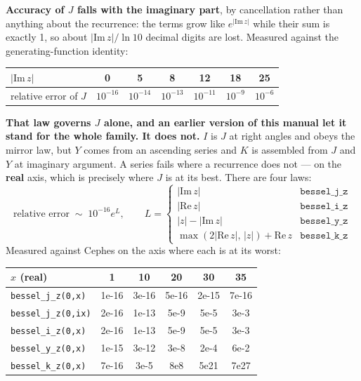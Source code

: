 \documentclass[11pt]{article}
\newcommand{\code}[1]{\texttt{#1}}
\begin{document}
\textbf{Accuracy of $J$ falls with the imaginary part}, by cancellation
rather than anything about the recurrence: the terms grow like
$e^{|\mathrm{Im}\,z|}$ while their sum is exactly 1, so about
$|\mathrm{Im}\,z|/\ln 10$ decimal digits are lost. Measured against the
generating-function identity:

\begin{center}
\begin{tabular}{lcccccc}
$|\mathrm{Im}\,z|$ & 0 & 5 & 8 & 12 & 18 & 25\\
\hline
relative error of $J$ & $10^{-16}$ & $10^{-14}$ & $10^{-13}$ &
$10^{-11}$ & $10^{-9}$ & $10^{-6}$\\
\end{tabular}
\end{center}

\textbf{That law governs $J$ alone, and an earlier version of this
manual let it stand for the whole family. It does not.} $I$ is $J$ at
right angles and obeys the mirror law, but $Y$ comes from an ascending
series and $K$ is assembled from $J$ and $Y$ at imaginary argument. A
series fails where a recurrence does not --- on the \textbf{real} axis,
which is precisely where $J$ is at its best. There are four laws:
\[
  \text{relative error} \;\sim\; 10^{-16}e^{L},\qquad
  L = \begin{cases}
    |\mathrm{Im}\,z| & \code{bessel\_j\_z}\\
    |\mathrm{Re}\,z| & \code{bessel\_i\_z}\\
    |z| - |\mathrm{Im}\,z| & \code{bessel\_y\_z}\\
    \max(2|\mathrm{Re}\,z|,\,|z|) + \mathrm{Re}\,z & \code{bessel\_k\_z}
  \end{cases}
\]
Measured against Cephes on the axis where each is at its worst:

\begin{center}
\begin{tabular}{lccccc}
$x$ (real) & 1 & 10 & 20 & 30 & 35\\
\hline
\code{bessel\_j\_z(0,x)}  & 1e-16 & 3e-16 & 5e-16 & 2e-15 & 7e-16\\
\code{bessel\_j\_z(0,ix)} & 2e-16 & 1e-13 & 5e-9  & 5e-5  & 3e-3\\
\code{bessel\_i\_z(0,x)}  & 2e-16 & 1e-13 & 5e-9  & 5e-5  & 3e-3\\
\code{bessel\_y\_z(0,x)}  & 1e-15 & 3e-12 & 3e-8  & 2e-4  & 6e-2\\
\code{bessel\_k\_z(0,x)}  & 7e-16 & 3e-5  & 8e8   & 5e21  & 7e27\\
\end{tabular}
\end{center}
\end{document}
